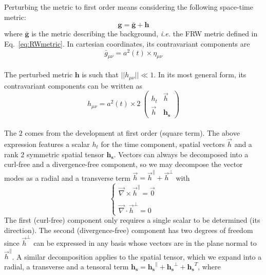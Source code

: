 Perturbing the metric to first order means considering the following space-time metric:
\begin{equation}
\pmb{g} = \pmb{\bar{g}} + \pmb{h}
\end{equation} where $\pmb{\bar{g}}$ is the metric describing the background, \textit{i.e.} the FRW metric defined in Eq.~\ref{eq:RWmetric}. In cartesian coordinates, its contravariant components are \\
\begin{equation}
\bar{g}_{\mu \nu} = a^2(t) \times \eta_{\mu \nu}
\end{equation} \\ The perturbed metric $\pmb{h}$ is such that $\vert \vert h_{\mu \nu} \vert \vert \ll 1$. In its most general form, its contravariant components can be written as \\
\begin{equation}
\label{eq:metric_perturb}
h_{\mu \nu} = a^2(t) \times 2~\left(
\begin{array}{cc}
	h_t & \vec{h}\\
	\vec{h} & \pmb{h_s}
\end{array}
\right)
\end{equation} \\ The $2$ comes from the development at first order (square term). The above expression features a scalar $h_t$ for the time component, spatial vectors $\vec{h}$ and a rank 2 symmetric spatial tensor $\pmb{h_s}$. Vectors can always be decomposed into a curl-free and a divergence-free component, so we may decompose the vector modes as a radial and a transverse term $\vec{h} = \vec{h}^{\parallel} + \vec{h}^{\bot}$ with
\begin{equation}
\left\{
\begin{array}{l}
\vec{\nabla} \times \vec{h}^{\parallel} = \vec{0}\\
\\
\vec{\nabla} \cdot \vec{h}^{\bot} = 0
\end{array}
\right.
\end{equation} The first (curl-free) component only requires a single scalar to be determined (its direction). The second (divergence-free) component has two degrees of freedom since $\vec{h}^{\bot}$ can be expressed in any basis whose vectors are in the plane normal to $\vec{h}^{\parallel}$. A similar decomposition applies to the spatial tensor, which we expand into a radial, a transverse and a tensoral term $\pmb{h_s} = \pmb{h_s}^{\parallel} + \pmb{h_s}^{\bot} + \pmb{h_s}^T$, where
